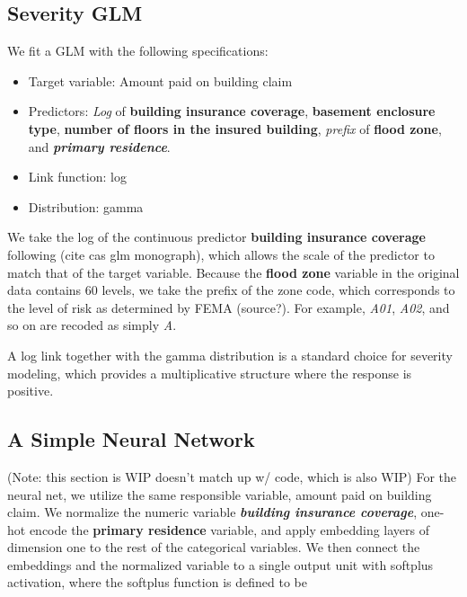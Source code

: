 \documentclass{article}
\begin{document}
\hypertarget{severity-glm}{%
\subsection{Severity GLM}\label{severity-glm}}

We fit a GLM with the following specifications:

\begin{itemize}
\item
  Target variable: Amount paid on building claim
\item
  Predictors: \emph{Log} of \textbf{building insurance coverage},
  \textbf{basement enclosure type}, \textbf{number of floors in the
  insured building}, \emph{prefix} of \textbf{flood zone}, and
  \textbf{\emph{primary residence}}.
\item
  Link function: log
\item
  Distribution: gamma
\end{itemize}

We take the log of the continuous predictor \textbf{building insurance
coverage} following (cite cas glm monograph), which allows the scale of
the predictor to match that of the target variable. Because the
\textbf{flood zone} variable in the original data contains 60 levels, we
take the prefix of the zone code, which corresponds to the level of risk
as determined by FEMA (source?). For example, \emph{A01}, \emph{A02},
and so on are recoded as simply \emph{A}.

A log link together with the gamma distribution is a standard choice for
severity modeling, which provides a multiplicative structure where the
response is positive.

\hypertarget{a-simple-neural-network}{%
\subsection{A Simple Neural Network}\label{a-simple-neural-network}}

(Note: this section is WIP doesn't match up w/ code, which is also WIP)
For the neural net, we utilize the same responsible variable, amount
paid on building claim. We normalize the numeric variable
\textbf{\emph{building insurance coverage}}, one-hot encode the
\textbf{primary residence} variable, and apply embedding layers of
dimension one to the rest of the categorical variables. We then connect
the embeddings and the normalized variable to a single output unit with
softplus activation, where the softplus function is defined to be
\end{document}
